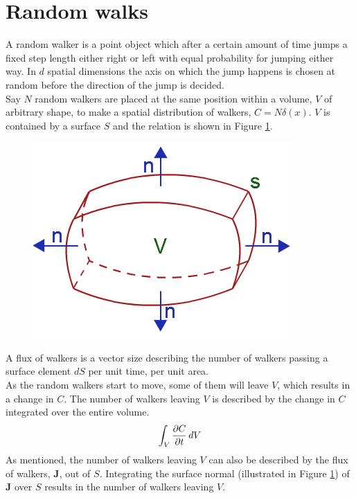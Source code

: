\section{Random walks}

A random walker is a point object which after a certain amount of time jumps a fixed step length either right or left with equal probability for jumping either way. 
In $d$ spatial dimensions the axis on which the jump happens is chosen at random before the direction of the jump is decided. \\
Say $N$ random walkers are placed at the same position within a volume, $V$ of arbitrary shape, to make a spatial distribution of walkers, $C = N\delta(x)$. 
$V$ is contained by a surface $S$ and the relation is shown in Figure \ref{theory:divergence_theorem}. 

\begin{figure}[H]
\centering
\includegraphics[scale=0.6]{Figures/divergence_theorem.png}
 \caption[]{}
 \label{theory:divergence_theorem}
\end{figure}

A flux of walkers is a vector size describing the number of walkers passing a surface element $dS$ per unit time, per unit area. \\

As the random walkers start to move, some of them will leave $V$, which results in a change in $C$. 
The number of walkers leaving $V$ is described by the change in $C$ integrated over the entire volume.
\begin{equation}
 \int_V \frac{\partial C}{\partial t}\,dV
\end{equation}
As mentioned, the number of walkers leaving $V$ can also be described by the flux of walkers, $\mathbf{J}$, out of $S$. 
Integrating the surface normal (illustrated in Figure \ref{theory:divergence_theorem}) of $\mathbf J$ over $S$ results in the number of walkers leaving $V$. 

